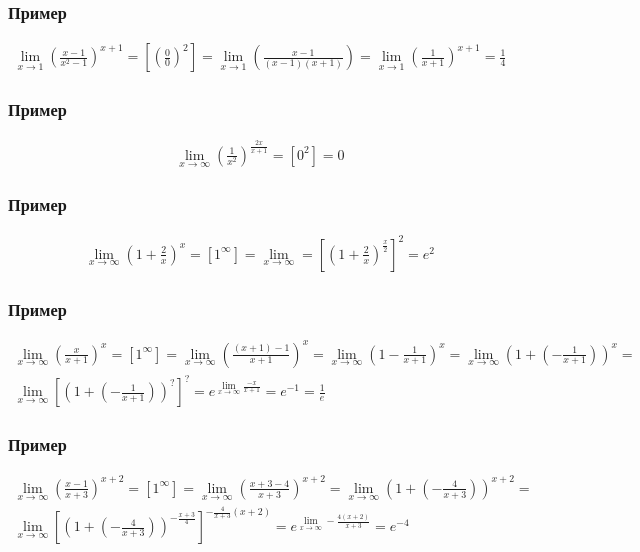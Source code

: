 \documentclass{article}
\begin{document}
\subsubsection{Пример}
\begin{gather*}
    \lim_{x \to 1} \left( \frac{x - 1}{x^2 - 1} \right)^{x + 1} = 
    \left[ \left( \frac{0}{0} \right)^2 \right] =
    \lim_{x \to 1} \left( \frac{x - 1}{(x - 1)(x + 1)} \right) =
    \lim_{x \to 1} \left( \frac{1}{x + 1} \right)^{x + 1} = \frac{1}{4}
\end{gather*}

\subsubsection{Пример}
\begin{gather*}
    \lim_{x \to \infty} \left( \frac{1}{x^2} \right)^{\frac{2x}{x + 1}} =
    \left[ 0^2 \right] = 0
\end{gather*}

\subsubsection{Пример}
\begin{gather*}
    \lim_{x \to \infty} \left( 1 + \frac{2}{x} \right)^x = 
    \left[ 1^{\infty} \right] = 
    \lim_{x \to \infty} = \left[ \left( 1 + \frac{2}{x} \right)^{\frac{x}{2}} \right]^2 = e^2
\end{gather*}

\subsubsection{Пример}
\begin{gather*}
    \lim_{x \to \infty} \left( \frac{x}{x + 1} \right)^x = 
    \left[ 1^{\infty} \right] = 
    \lim_{x \to \infty} \left( \frac{(x + 1) - 1}{x + 1} \right)^x =
    \lim_{x \to \infty} \left( 1 - \frac{1}{x + 1} \right)^x = 
    \lim_{x \to \infty} \left( 1 + \left( -\frac{1}{x + 1} \right) \right)^x = \\
    \lim_{x \to \infty} \left[ \left( 1 + \left(-\frac{1}{x + 1} \right) \right)^{?} \right]^{?} =
    e^{\lim_{x \to \infty} \frac{-x}{x + 1}} = e^{-1} = \frac{1}{e}
\end{gather*}

\subsubsection{Пример}
\begin{gather*}
    \lim_{x \to \infty} \left(\frac{x - 1}{x + 3}\right)^{x + 2} = \left[1^\infty\right] = 
    \lim_{x \to \infty} \left(\frac{x + 3 - 4}{x + 3}\right)^{x + 2} =
    \lim_{x \to \infty} \left(1 + \left(-\frac{4}{x + 3}\right) \right)^{x + 2} = \\
    \lim_{x \to \infty} \left[ \left(1 + \left(-\frac{4}{x + 3}\right) \right)^{-\frac{x + 3}{4}} \right]^{-\frac{4}{x + 3} (x + 2)} =
    e^{\lim_{x \to \infty} -\frac{4(x + 2)}{x + 3}} = e^{-4}
\end{gather*}
\end{document}
